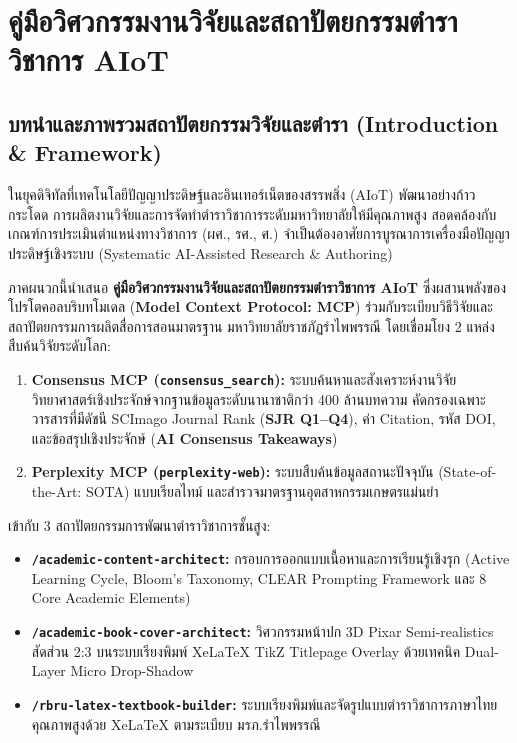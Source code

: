 \chapter{คู่มือวิศวกรรมงานวิจัยและสถาปัตยกรรมตำราวิชาการ AIoT}
\label{ch:appendix_mcp_guide}

\section{บทนำและภาพรวมสถาปัตยกรรมวิจัยและตำรา (Introduction \& Framework)}

ในยุคดิจิทัลที่เทคโนโลยีปัญญาประดิษฐ์และอินเทอร์เน็ตของสรรพสิ่ง (AIoT) พัฒนาอย่างก้าวกระโดด การผลิตงานวิจัยและการจัดทำตำราวิชาการระดับมหาวิทยาลัยให้มีคุณภาพสูง สอดคล้องกับเกณฑ์การประเมินตำแหน่งทางวิชาการ (ผศ., รศ., ศ.) จำเป็นต้องอาศัยการบูรณาการเครื่องมือปัญญาประดิษฐ์เชิงระบบ (Systematic AI-Assisted Research \& Authoring) 

ภาคผนวกนี้นำเสนอ \textbf{คู่มือวิศวกรรมงานวิจัยและสถาปัตยกรรมตำราวิชาการ AIoT} ซึ่งผสานพลังของโปรโตคอลบริบทโมเดล (\textbf{Model Context Protocol: MCP}) ร่วมกับระเบียบวิธีวิจัยและสถาปัตยกรรมการผลิตสื่อการสอนมาตรฐาน มหาวิทยาลัยราชภัฏรำไพพรรณี โดยเชื่อมโยง 2 แหล่งสืบค้นวิจัยระดับโลก:
\begin{enumerate}
    \item \textbf{Consensus MCP (\texttt{consensus\_search}):} ระบบค้นหาและสังเคราะห์งานวิจัยวิทยาศาสตร์เชิงประจักษ์จากฐานข้อมูลระดับนานาชาติกว่า 400 ล้านบทความ คัดกรองเฉพาะวารสารที่มีดัชนี SCImago Journal Rank (\textbf{SJR Q1--Q4}), ค่า Citation, รหัส DOI, และข้อสรุปเชิงประจักษ์ (\textbf{AI Consensus Takeaways})
    \item \textbf{Perplexity MCP (\texttt{perplexity-web}):} ระบบสืบค้นข้อมูลสถานะปัจจุบัน (State-of-the-Art: SOTA) แบบเรียลไทม์ และสำรวจมาตรฐานอุตสาหกรรมเกษตรแม่นยำ
\end{enumerate}

เข้ากับ 3 สถาปัตยกรรมการพัฒนาตำราวิชาการชั้นสูง:
\begin{itemize}
    \item \textbf{\texttt{/academic-content-architect}:} กรอบการออกแบบเนื้อหาและการเรียนรู้เชิงรุก (Active Learning Cycle, Bloom's Taxonomy, CLEAR Prompting Framework และ 8 Core Academic Elements)
    \item \textbf{\texttt{/academic-book-cover-architect}:} วิศวกรรมหน้าปก 3D Pixar Semi-realistics สัดส่วน 2:3 บนระบบเรียงพิมพ์ XeLaTeX TikZ Titlepage Overlay ด้วยเทคนิค Dual-Layer Micro Drop-Shadow
    \item \textbf{\texttt{/rbru-latex-textbook-builder}:} ระบบเรียงพิมพ์และจัดรูปแบบตำราวิชาการภาษาไทยคุณภาพสูงด้วย XeLaTeX ตามระเบียบ มรภ.รำไพพรรณี
\end{itemize}

